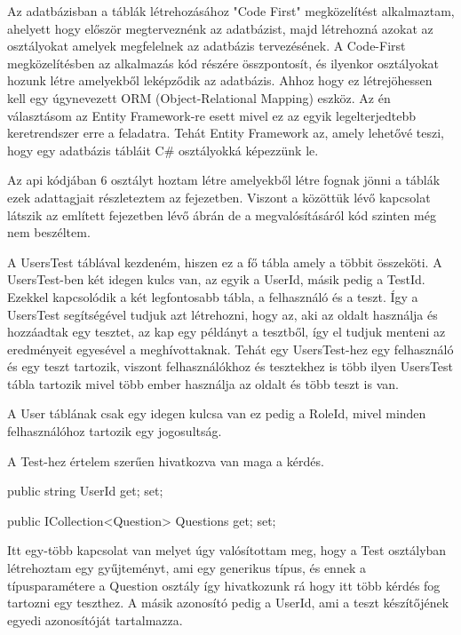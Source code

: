 




Az adatbázisban a táblák létrehozásához "Code First" megközelítést alkalmaztam, ahelyett hogy először megterveznénk az adatbázist, majd létrehozná azokat az osztályokat amelyek megfelelnek az adatbázis tervezésének. A Code-First megközelítésben az alkalmazás kód részére összpontosít, és ilyenkor osztályokat hozunk létre amelyekből leképződik az adatbázis. Ahhoz hogy ez létrejöhessen kell egy úgynevezett ORM (Object-Relational Mapping) eszköz. Az én választásom az Entity Framework-re esett mivel ez az egyik legelterjedtebb keretrendszer erre a feladatra. Tehát Entity Framework az, amely lehetővé teszi, hogy egy adatbázis tábláit C\# osztályokká képezzünk le. \newline

Az api kódjában 6 osztályt hoztam létre amelyekből létre fognak jönni a táblák ezek adattagjait részleteztem az  fejezetben.
Viszont a közöttük lévő kapcsolat látszik az említett fejezetben lévő ábrán de a megvalósításáról kód szinten még nem beszéltem. \newline

A UsersTest táblával kezdeném, hiszen ez a fő tábla amely a többit összeköti.
A UsersTest-ben két idegen kulcs van, az egyik a UserId, másik pedig a TestId. Ezekkel kapcsolódik a két legfontosabb tábla, a felhasználó és a teszt. Így a UsersTest segítségével tudjuk azt létrehozni, hogy az, aki az oldalt használja és hozzáadtak egy tesztet, az kap egy példányt a tesztből, így el tudjuk menteni az eredményeit egyesével a meghívottaknak.
Tehát egy UsersTest-hez egy felhasználó és egy teszt tartozik, viszont felhasználókhoz és tesztekhez is több ilyen UsersTest tábla tartozik mivel több ember használja az oldalt és több teszt is van. \newline


A User táblának csak egy idegen kulcsa van ez pedig a RoleId, mivel minden felhasználóhoz tartozik egy jogosultság.\newline


A Test-hez értelem szerűen hivatkozva van maga a kérdés.
\begin{cpp}
    public string UserId { get; set; }

    public ICollection<Question> Questions { get; set; }
\end{cpp}
Itt egy-több kapcsolat van melyet úgy valósítottam meg, hogy a Test osztályban létrehoztam egy gyűjteményt, ami egy generikus típus, és ennek a típusparamétere a Question osztály így hivatkozunk rá hogy itt több kérdés fog tartozni egy teszthez. A másik azonosító pedig a UserId, ami a teszt készítőjének egyedi azonosítóját tartalmazza. \newline

